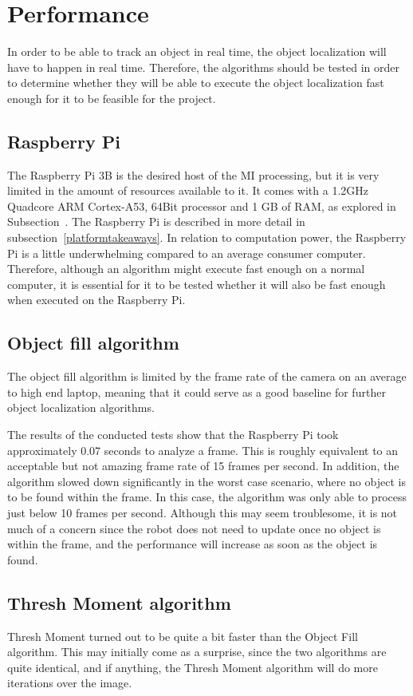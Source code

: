 \section{Performance}\label{des:sec:performance}
In order to be able to track an object in real time, the object localization will have to happen in real time.
Therefore, the algorithms should be tested in order to determine whether they will be able to execute the object localization fast enough for it to be feasible for the project.

\subsection{Raspberry Pi}
The Raspberry Pi 3B is the desired host of the MI processing, but it is very limited in the amount of resources available to it.
It comes with a 1.2GHz Quadcore ARM Cortex-A53, 64Bit processor and 1 GB of RAM, as explored in Subsection~\cite{subsec:rpispecs}.
The Raspberry Pi is described in more detail in subsection~\ref{platformtakeaways}.
In relation to computation power, the Raspberry Pi is a little underwhelming compared to an average consumer computer.
Therefore, although an algorithm might execute fast enough on a normal computer, it is essential for it to be tested whether it will also be fast enough when executed on the Raspberry Pi.

\subsection{Object fill algorithm}
The object fill algorithm is limited by the frame rate of the camera on an average to high end laptop, meaning that it could serve as a good baseline for further object localization algorithms.

The results of the conducted tests show that the Raspberry Pi took approximately 0.07 seconds to analyze a frame.
This is roughly equivalent to an acceptable but not amazing frame rate of 15 frames per second.
In addition, the algorithm slowed down significantly in the worst case scenario, where no object is to be found within the frame.
In this case, the algorithm was only able to process just below 10 frames per second.
Although this may seem troublesome, it is not much of a concern since the robot does not need to update once no object is within the frame, and the performance will increase as soon as the object is found.

\subsection{Thresh Moment algorithm}
Thresh Moment turned out to be quite a bit faster than the Object Fill algorithm.
This may initially come as a surprise, since the two algorithms are quite identical, and if anything, the Thresh Moment algorithm will do more iterations over the image.

